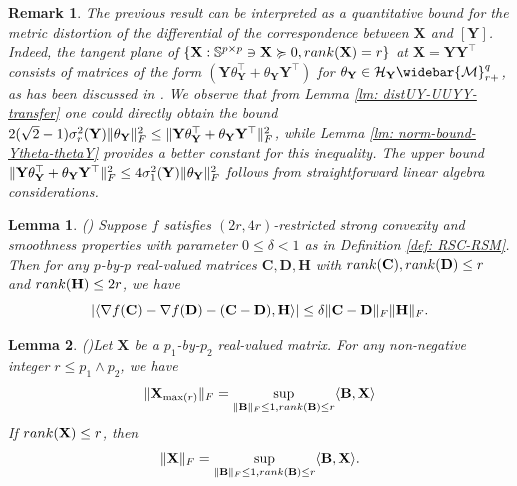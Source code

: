 \documentclass[11pt]{article}
\newtheorem{Lemma}{Lemma}
\newtheorem{Remark}{Remark}
\newcommand{\bbS}{\mathbb{S}}
\newcommand{\cH}{\mathcal{H}}
\newcommand{\0}{{\mathbf{0}}}
\newcommand{\1}{{\mathbf{1}}}
\newcommand{\X}{{\mathbf{X}}}
\newcommand{\B}{{\mathbf{B}}}
\newcommand{\C}{{\mathbf{C}}}
\newcommand{\D}{{\mathbf{D}}}
\renewcommand{\H}{{\mathbf{H}}}
\newcommand{\Y}{{\mathbf{Y}}}
\newcommand{\cM}{{\cal M}}
\newcommand{\rank}{{\rm rank}}
\newcommand{\F}{{\rm F}}
\newcommand{\nc}{\normalcolor}
\begin{document}
 
\begin{Remark}
The previous result can be interpreted as a quantitative bound for the metric distortion of the differential of the correspondence between $\X$ and $[\Y]$. 
Indeed, the tangent plane of $\{\X:\bbS^{p \times p} \ni \X \succcurlyeq 0, \rank(\X) = r \}$ at $\X= \Y \Y^\top $ consists of matrices of the form $(\Y \theta_\Y^\top + \theta_\Y \Y^\top  )$ for $\theta_\Y \in \cH_\Y \widebar{\cM}_{r+}^{q} $, as has been discussed in \cite{luo2021geometric}.  { We observe that from Lemma \ref{lm: distUY-UUYY-transfer} one could directly obtain the bound $ 2(\sqrt{2} -1) \sigma^2_r(\Y) \|\theta_\Y\|_\F^2  \leq \|\Y \theta_\Y^\top + \theta_\Y \Y^\top \|_\F^2$}, while Lemma \ref{lm: norm-bound-Ytheta-thetaY} provides a better constant for this inequality. The upper bound $\|\Y \theta_\Y^\top + \theta_\Y \Y^\top \|_\F^2 \leq 4 \sigma^2_1(\Y) \|\theta_\Y\|_\F^2$ follows from straightforward linear algebra considerations.


\end{Remark}

\nc

\begin{Lemma}(\cite[Lemma 10]{zhu2017global}) \label{lm: RIP-imply-gradient-bound}
	Suppose $f$ satisfies $(2r,4r)$-restricted strong convexity and smoothness properties with parameter $0\leq \delta < 1$ as in Definition \ref{def: RSC-RSM}. Then for any $p$-by-$p$ \nc real-valued matrices $\C,\D,\H$ with $\rank(\C), \rank(\D) \leq r$ and $\rank(\H) \leq 2r$, we have
	\begin{equation*}
		\left| \langle \nabla f(\C) - \nabla f(\D) - (\C - \D)  , \H \rangle  \right| \leq \delta \| \C - \D \|_\F \|\H\|_\F.
	\end{equation*}
\end{Lemma}



\begin{Lemma}(\cite[Lemma 3]{luo2021schatten})\label{lm: charac of Schatten-q norm}
Let $\X$ be a $p_1$-by-$p_2$ real-valued matrix. For any non-negative integer $r \leq p_1 \wedge p_2$, we have
    \begin{equation}\label{eq: truncated schatten q norm}
        \|\X_{\max(r)}\|_\F = \sup_{\|\B\|_\F \leq 1, \rank(\B) \leq r}  \langle \B, \X \rangle
    \end{equation} 
    If $\rank(\X) \leq r$, then 
    \begin{equation}\label{eq: schatten q norm of rank r matrix}
         \|\X\|_\F = \sup_{\|\B\|_\F \leq 1, \rank(\B) \leq r}  \langle \B, \X \rangle.
    \end{equation}
\end{Lemma}







\end{document}
